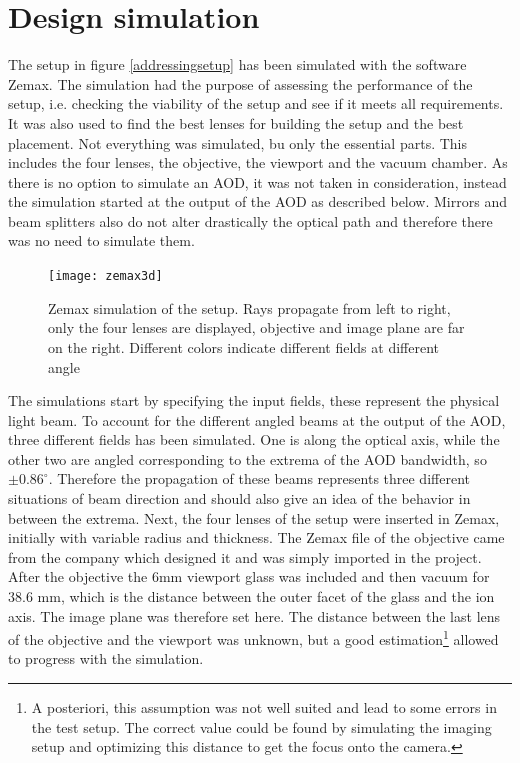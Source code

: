 \section{Design simulation}
The setup in figure \ref{addressingsetup} has been simulated with the software Zemax. The simulation had the purpose of assessing the performance of the setup, i.e. checking the viability of the setup and see if it meets all requirements. It was also used to find the best lenses for building the setup and the best placement. Not everything was simulated, bu only the essential parts. This includes the four lenses, the objective, the viewport and the vacuum chamber. As there is no option to simulate an AOD, it was not taken in consideration, instead the simulation started at the output of the AOD as described below. Mirrors and beam splitters also do not alter drastically the optical path and therefore there was no need to simulate them.
\begin{figure}[H]
\centering
\texttt{[image: zemax3d]}
\caption{Zemax simulation of the setup. Rays propagate from left to right, only the four lenses are displayed, objective and image plane are far on the right. Different colors indicate different fields at different angle}
\label{zemaxview}
\end{figure}
The simulations start by specifying the input fields, these represent the physical light beam. To account for the different angled beams at the output of the AOD, three different fields has been simulated. One is along the optical axis, while the other two are angled corresponding to the extrema of the AOD bandwidth, so $\pm0.86^{\circ}$. Therefore the propagation of these beams represents three different situations of beam direction and should also give an idea of the behavior in between the extrema. Next, the four lenses of the setup were inserted in Zemax, initially with variable radius and thickness. The Zemax file of the objective came from the company which designed it and was simply imported in the project. After the objective the 6mm viewport glass was included and then vacuum for 38.6 mm, which is the distance between the outer facet of the glass and the ion axis. The image plane was therefore set here. The distance between the last lens of the objective and the viewport was unknown, but a good estimation\footnote{A posteriori, this assumption was not well suited and lead to some errors in the test setup. The correct value could be found by simulating the imaging setup and optimizing this distance to get the focus onto the camera.} allowed to progress with the simulation.
